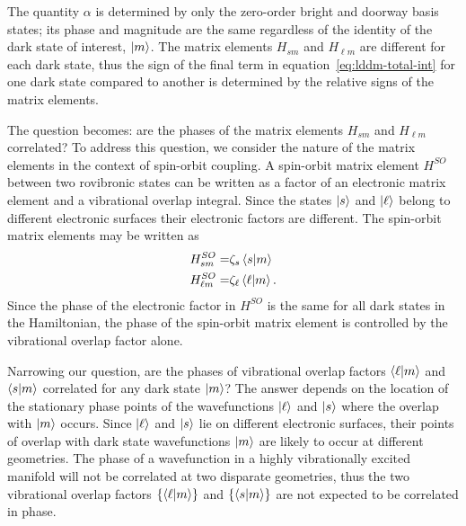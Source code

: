 \documentclass[12pt]{mitthesis}
\begin{document}
The quantity $\alpha$ is determined by only the zero-order bright and
doorway basis states; its phase and magnitude are the same
regardless of the identity of the dark state of interest, $\mathinner{|{m}\rangle}$.
The matrix elements $H_{s m}$ and $H_{\ell m}$ are different for
each dark state, thus the sign of the final term in
equation~\ref{eq:lddm-total-int} for one dark state compared to
another is determined by the relative signs of the matrix elements.

The question becomes: are the phases of the matrix elements $H_{s m}$
and $H_{\ell m}$ correlated?  To address this question, we consider
the nature of the matrix elements in the context of spin-orbit
coupling.  A spin-orbit matrix element $H^{SO}$ between two rovibronic
states can be written as a factor of an electronic matrix element and
a vibrational overlap integral.  Since the states $\mathinner{|{s}\rangle}$ and
$\mathinner{|{\ell}\rangle}$ belong to different electronic surfaces their electronic
factors are different.  The spin-orbit matrix elements may be written
as
\begin{subequations}
  \label{eq:spinorbit-factors}
  \begin{align}
    H_{s m}^{SO} =& \zeta_s \mathinner{\langle{s|m}\rangle}\\
    H_{\ell m}^{SO} =& \zeta_\ell \mathinner{\langle{\ell|m}\rangle}.
  \end{align}
\end{subequations}
Since the phase of the electronic factor in $H^{SO}$ is the same for
all dark states in the Hamiltonian, the phase of the spin-orbit matrix
element is controlled by the vibrational overlap factor alone.

Narrowing our question, are the phases of vibrational overlap factors
$\mathinner{\langle{\ell|m}\rangle}$ and $\mathinner{\langle{s|m}\rangle}$ correlated for any dark state
$\mathinner{|{m}\rangle}$?  The answer depends on the location of the stationary phase
points of the wavefunctions $\mathinner{|{\ell}\rangle}$ and $\mathinner{|{s}\rangle}$ where the
overlap with $\mathinner{|{m}\rangle}$ occurs.  Since $\mathinner{|{\ell}\rangle}$ and $\mathinner{|{s}\rangle}$ lie
on different electronic surfaces, their points of overlap with dark
state wavefunctions $\mathinner{|{m}\rangle}$ are likely to occur at different
geometries.  The phase of a wavefunction in a highly vibrationally
excited manifold will not be correlated at two disparate geometries,
thus the two vibrational overlap factors $\lbrace \mathinner{\langle{\ell|m}\rangle}
\rbrace$ and $\lbrace \mathinner{\langle{s|m}\rangle} \rbrace$ are not expected to be
correlated in phase.
\end{document}
